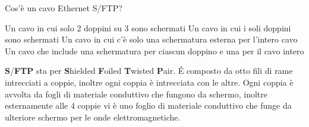 \question
Cos'è un cavo Ethernet S/FTP?

\begin{checkboxes}
	\choice Un cavo in cui solo 2 doppini su 3 sono schermati
	\choice Un cavo in cui i soli doppini sono schermati
	\choice Un cavo in cui c'è solo una schermatura esterna per l'intero cavo
	\CorrectChoice Un cavo che include una schermatura per ciascun doppino e una per il cavo intero
\end{checkboxes}

\begin{solution}
\textbf{S}/\textbf{FTP} sta per \textbf{S}hielded \textbf{F}oiled \textbf{T}wisted \textbf{P}air.
\'E composto da otto fili di rame intrecciati a coppie, inoltre ogni coppia è intrecciata con le altre.
Ogni coppia è avvolta da fogli di materiale conduttivo che fungono da schermo, inoltre esternamente alle 4 coppie vi è uno foglio di materiale conduttivo che funge da ulteriore schermo per le onde elettromagnetiche.
\end{solution}
